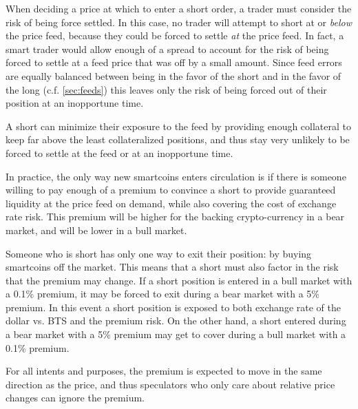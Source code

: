 When deciding a price at which to enter a short order, a trader must consider
the risk of being force settled. In this case, no trader will attempt to short
at or \emph{below} the price feed, because they could be forced to settle
\emph{at} the price feed. In fact, a smart trader would allow enough of a
spread to account for the risk of being forced to settle at a feed price that
was off by a small amount. Since feed errors are equally balanced between being
in the favor of the short and in the favor of the long (c.f. \cref{sec:feeds})
this leaves only the risk of being forced out of their position at an
inopportune time.

A short can minimize their exposure to the feed by providing enough collateral
to keep far above the least collateralized positions, and thus stay very
unlikely to be forced to settle at the feed or at an inopportune time.

\medskip
In practice, the only way new smartcoins enters circulation is if there is
someone willing to pay enough of a premium to convince a short to provide
guaranteed liquidity at the price feed on demand, while also covering the cost
of exchange rate risk. This premium will be higher for the backing
crypto-currency in a bear market, and will be lower in a bull market.

Someone who is short has only one way to exit their position: by buying
smartcoins off the market. This means that a short must also factor in the risk
that the premium may change. If a short position is entered in a bull market
with a 0.1\% premium, it may be forced to exit during a bear market with a 5\%
premium. In this event a short position is exposed to both exchange rate of the
dollar vs. BTS and the premium risk. On the other hand, a short entered during
a bear market with a 5\% premium may get to cover during a bull market with a
0.1\% premium.

For all intents and purposes, the premium is expected to move in the same
direction as the price, and thus speculators who only care about relative price
changes can ignore the premium.
